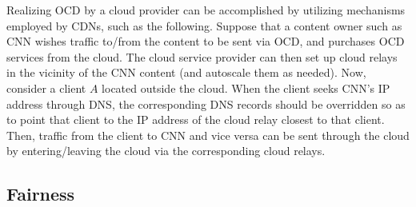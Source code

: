 \documentclass[newfonts=false,format=sigconf,anonymous,10pt,letterpaper]{acmart}
\providecommand{\etc}{\emph{etc.} }
\begin{document}
Realizing OCD by a cloud provider can be accomplished by utilizing mechanisms employed by CDNs, such as the following. Suppose that a content owner such as CNN wishes traffic to/from the content to be sent via OCD, and purchases OCD services from the cloud. The cloud service provider can then set up cloud relays in the vicinity of the CNN content (and autoscale them as needed). Now, consider a client $A$ located outside the cloud. When the client seeks CNN's IP address through DNS, the corresponding DNS records should be overridden so as to point that client to the IP address of the cloud relay closest to that client. Then, traffic from the client to CNN and vice versa can be sent through the cloud by entering/leaving the cloud via the corresponding cloud relays.



\subsection{Fairness}
\end{document}
